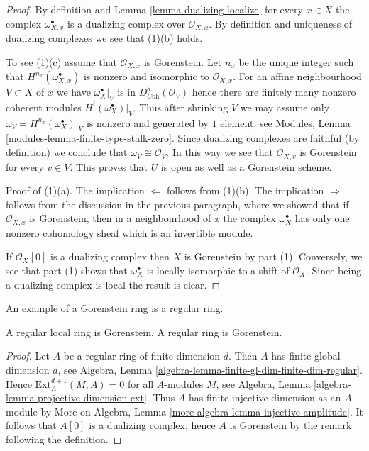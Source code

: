 \begin{proof}
By definition and Lemma \ref{lemma-dualizing-localize} for every $x \in X$
the complex $\omega_{X, x}^\bullet$ is a dualizing complex over
$\mathcal{O}_{X, x}$. By definition and uniqueness of dualizing
complexes we see that (1)(b) holds.

\medskip\noindent
To see (1)(c) assume that $\mathcal{O}_{X, x}$ is Gorenstein.
Let $n_x$ be the unique integer such that $H^{n_{x}}(\omega_{X, x}^\bullet)$
is nonzero and isomorphic to $\mathcal{O}_{X, x}$.
For an affine neighbourhood $V \subset X$
of $x$ we have $\omega_X^\bullet|_V$ is in $D^b_{\textit{Coh}}(\mathcal{O}_V)$
hence there are finitely many nonzero coherent modules
$H^i(\omega_X^\bullet)|_V$. Thus after shrinking $V$ we may assume
only $\omega_V = H^{n_x}(\omega_X^\bullet)|_V$
is nonzero and generated by $1$ element, see
Modules, Lemma \ref{modules-lemma-finite-type-stalk-zero}.
Since dualizing complexes are faithful (by definition)
we conclude that $\omega_V \cong \mathcal{O}_V$.
In this way we see that $\mathcal{O}_{X, v}$ is Gorenstein
for every $v \in V$. This proves that $U$ is open as well
as a Gorenstein scheme.

\medskip\noindent
Proof of (1)(a). The implication $\Leftarrow$ follows from (1)(b).
The implication $\Rightarrow$ follows from the discussion
in the previous paragraph, where we showed that if $\mathcal{O}_{X, x}$
is Gorenstein, then in a neighbourhood of $x$ the complex
$\omega_X^\bullet$ has only one nonzero cohomology sheaf
which is an invertible module.

\medskip\noindent
If $\mathcal{O}_X[0]$ is a dualizing complex then $X$ is Gorenstein by
part (1). Conversely, we see that part (1) shows that
$\omega_X^\bullet$ is locally isomorphic to a shift of $\mathcal{O}_X$.
Since being a dualizing complex is local the result is clear.
\end{proof}

\noindent
An example of a Gorenstein ring is a regular ring.

\begin{lemma}
\label{lemma-regular-gorenstein}
A regular local ring is Gorenstein.
A regular ring is Gorenstein.
\end{lemma}

\begin{proof}
Let $A$ be a regular ring of finite dimension $d$. Then $A$ has finite
global dimension $d$, see
Algebra, Lemma \ref{algebra-lemma-finite-gl-dim-finite-dim-regular}.
Hence $\text{Ext}^{d + 1}_A(M, A) = 0$ for all $A$-modules $M$, see
Algebra, Lemma \ref{algebra-lemma-projective-dimension-ext}.
Thus $A$ has finite injective dimension as an $A$-module by
More on Algebra, Lemma \ref{more-algebra-lemma-injective-amplitude}.
It follows that $A[0]$ is a dualizing complex, hence $A$ is
Gorenstein by the remark following the definition.
\end{proof}

